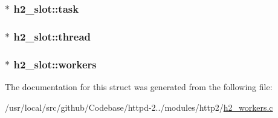 \subsubsection[{\texorpdfstring{task}{task}}]{$\ast$ h2\+\_\+slot\+::task}\hypertarget{structh2__slot_ab59aafc8a725239060ea627b2591def2}{}\label{structh2__slot_ab59aafc8a725239060ea627b2591def2}
\subsubsection[{\texorpdfstring{thread}{thread}}]{$\ast$ h2\+\_\+slot\+::thread}\hypertarget{structh2__slot_aee61c07c369d8a2e3185f7fbfb970b8f}{}\label{structh2__slot_aee61c07c369d8a2e3185f7fbfb970b8f}
\subsubsection[{\texorpdfstring{workers}{workers}}]{$\ast$ h2\+\_\+slot\+::workers}\hypertarget{structh2__slot_abcc9e95506f2ed943f8171f1af7d54f0}{}\label{structh2__slot_abcc9e95506f2ed943f8171f1af7d54f0}


The documentation for this struct was generated from the following file\+:\begin{DoxyCompactItemize}
\item 
/usr/local/src/github/\+Codebase/httpd-\/2../modules/http2/\hyperlink{h2__workers_8c}{h2\+\_\+workers.\+c}\end{DoxyCompactItemize}
